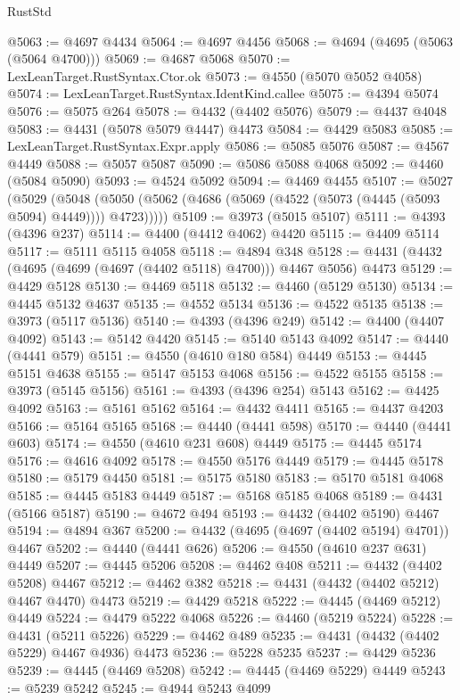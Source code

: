 \begin{lexlean}{RustStd}
\begin{coremodule}
@5063 := @4697 @4434
@5064 := @4697 @4456
@5068 := @4694 (@4695 (@5063 (@5064 @4700)))
@5069 := @4687 @5068
@5070 := LexLeanTarget.RustSyntax.Ctor.ok
@5073 := @4550 (@5070 @5052 @4058)
@5074 := LexLeanTarget.RustSyntax.IdentKind.callee
@5075 := @4394 @5074
@5076 := @5075 @264
@5078 := @4432 (@4402 @5076)
@5079 := @4437 @4048
@5083 := @4431 (@5078 @5079 @4447) @4473
@5084 := @4429 @5083
@5085 := LexLeanTarget.RustSyntax.Expr.apply
@5086 := @5085 @5076
@5087 := @4567 @4449
@5088 := @5057 @5087
@5090 := @5086 @5088 @4068
@5092 := @4460 (@5084 @5090)
@5093 := @4524 @5092
@5094 := @4469 @4455
@5107 := @5027
    (@5029
      (@5048 (@5050 (@5062 (@4686 (@5069 (@4522 (@5073 (@4445 (@5093 @5094) @4449)))) @4723)))))
@5109 := @3973 (@5015 @5107)
@5111 := @4393 (@4396 @237)
@5114 := @4400 (@4412 @4062) @4420
@5115 := @4409 @5114
@5117 := @5111 @5115 @4058
@5118 := @4894 @348
@5128 := @4431 (@4432 (@4695 (@4699 (@4697 (@4402 @5118) @4700))) @4467 @5056) @4473
@5129 := @4429 @5128
@5130 := @4469 @5118
@5132 := @4460 (@5129 @5130)
@5134 := @4445 @5132 @4637
@5135 := @4552 @5134
@5136 := @4522 @5135
@5138 := @3973 (@5117 @5136)
@5140 := @4393 (@4396 @249)
@5142 := @4400 (@4407 @4092)
@5143 := @5142 @4420
@5145 := @5140 @5143 @4092
@5147 := @4440 (@4441 @579)
@5151 := @4550 (@4610 @180 @584) @4449
@5153 := @4445 @5151 @4638
@5155 := @5147 @5153 @4068
@5156 := @4522 @5155
@5158 := @3973 (@5145 @5156)
@5161 := @4393 (@4396 @254) @5143
@5162 := @4425 @4092
@5163 := @5161 @5162
@5164 := @4432 @4411
@5165 := @4437 @4203
@5166 := @5164 @5165
@5168 := @4440 (@4441 @598)
@5170 := @4440 (@4441 @603)
@5174 := @4550 (@4610 @231 @608) @4449
@5175 := @4445 @5174
@5176 := @4616 @4092
@5178 := @4550 @5176 @4449
@5179 := @4445 @5178
@5180 := @5179 @4450
@5181 := @5175 @5180
@5183 := @5170 @5181 @4068
@5185 := @4445 @5183 @4449
@5187 := @5168 @5185 @4068
@5189 := @4431 (@5166 @5187)
@5190 := @4672 @494
@5193 := @4432 (@4402 @5190) @4467
@5194 := @4894 @367
@5200 := @4432 (@4695 (@4697 (@4402 @5194) @4701)) @4467
@5202 := @4440 (@4441 @626)
@5206 := @4550 (@4610 @237 @631) @4449
@5207 := @4445 @5206
@5208 := @4462 @408
@5211 := @4432 (@4402 @5208) @4467
@5212 := @4462 @382
@5218 := @4431 (@4432 (@4402 @5212) @4467 @4470) @4473
@5219 := @4429 @5218
@5222 := @4445 (@4469 @5212) @4449
@5224 := @4479 @5222 @4068
@5226 := @4460 (@5219 @5224)
@5228 := @4431 (@5211 @5226)
@5229 := @4462 @489
@5235 := @4431 (@4432 (@4402 @5229) @4467 @4936) @4473
@5236 := @5228 @5235
@5237 := @4429 @5236
@5239 := @4445 (@4469 @5208)
@5242 := @4445 (@4469 @5229) @4449
@5243 := @5239 @5242
@5245 := @4944 @5243 @4099

\end{coremodule}
\end{lexlean}
